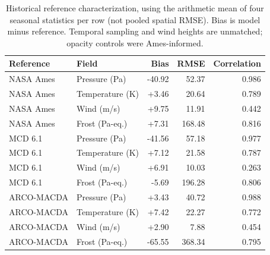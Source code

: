 \begin{table}[t]\centering\small
\caption{Historical reference characterization, using the arithmetic mean of four seasonal statistics per row (not pooled spatial RMSE). Bias is model minus reference. Temporal sampling and wind heights are unmatched; opacity controls were Ames-informed.}
\label{tab:reference}\label{mola-table}
\begin{tabular}{llrrr}\toprule
Reference & Field & Bias & RMSE & Correlation \\\midrule
NASA Ames & Pressure (Pa) & -40.92 & 52.37 & 0.986 \\
NASA Ames & Temperature (K) & +3.46 & 20.64 & 0.789 \\
NASA Ames & Wind (m/s) & +9.75 & 11.91 & 0.442 \\
NASA Ames & Frost (Pa-eq.) & +7.31 & 168.48 & 0.816 \\
MCD 6.1 & Pressure (Pa) & -41.56 & 57.18 & 0.977 \\
MCD 6.1 & Temperature (K) & +7.12 & 21.58 & 0.787 \\
MCD 6.1 & Wind (m/s) & +6.91 & 10.03 & 0.263 \\
MCD 6.1 & Frost (Pa-eq.) & -5.69 & 196.28 & 0.806 \\
ARCO-MACDA & Pressure (Pa) & +3.43 & 40.72 & 0.988 \\
ARCO-MACDA & Temperature (K) & +7.42 & 22.27 & 0.772 \\
ARCO-MACDA & Wind (m/s) & +2.90 & 7.88 & 0.454 \\
ARCO-MACDA & Frost (Pa-eq.) & -65.55 & 368.34 & 0.795 \\
\bottomrule\end{tabular}\end{table}

